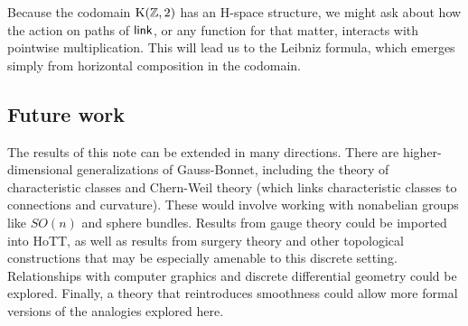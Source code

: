 Because the codomain \( \mathrm{K}(\mathbb{Z},2) \) has an H-space structure, we might ask about how the action on paths of \( \mathsf{link} \), or any function for that matter, interacts with pointwise multiplication. This will lead us to the Leibniz formula, which emerges simply from horizontal composition in the codomain.

\subsection{Future work}
The results of this note can be extended in many directions. There are higher-dimensional generalizations of Gauss-Bonnet, including the theory of characteristic classes and Chern-Weil theory (which links characteristic classes to connections and curvature). These would involve working with nonabelian groups like \( SO(n) \) and sphere bundles. Results from gauge theory could be imported into HoTT, as well as results from surgery theory and other topological constructions that may be especially amenable to this discrete setting. Relationships with computer graphics and discrete differential geometry\cite{crane_ddg}\cite{crane_connections} could be explored. Finally, a theory that reintroduces smoothness could allow more formal versions of the analogies explored here. 
